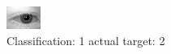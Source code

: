 \begin{figure}[h!]
\begin{center}
\includegraphics[width=0.60\columnwidth]{figures/ID512_class_1_target_2.png}
\end{center}
\caption{ Classification: 1 actual target: 2}
\label{fig:ID512_class_1_target_2}
\end{figure}
